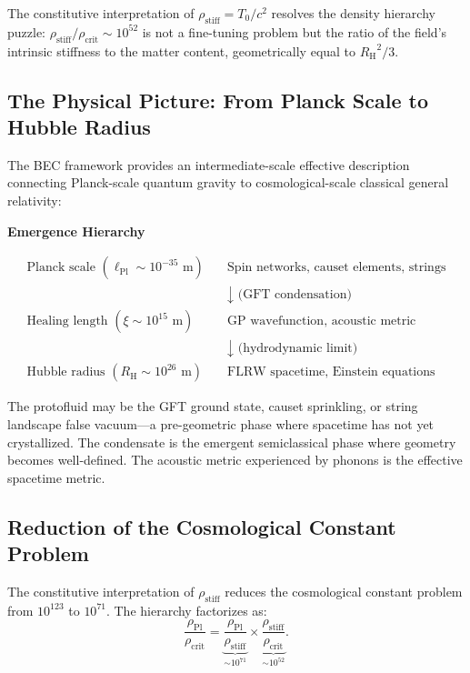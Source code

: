 \documentclass[11pt,a4paper]{article}
\newcommand{\lPl}{\ensuremath{\ell_{\mathrm{Pl}}}}
\newcommand{\rhocrit}{\ensuremath{\rho_{\mathrm{crit}}}}
\newcommand{\rhostiff}{\ensuremath{\rho_{\mathrm{stiff}}}}
\newcommand{\rhoPl}{\ensuremath{\rho_{\mathrm{Pl}}}}
\newcommand{\Tzero}{\ensuremath{T_0}}
\newcommand{\RH}{\ensuremath{R_{\mathrm{H}}}}
\theoremstyle{definition}
\theoremstyle{remark}
\begin{document}
The constitutive interpretation of $\rhostiff = \Tzero/c^2$ resolves the density hierarchy puzzle: $\rhostiff/\rhocrit \sim 10^{52}$ is not a fine-tuning problem but the ratio of the field's intrinsic stiffness to the matter content, geometrically equal to $\RH^2/3$.

\subsection{The Physical Picture: From Planck Scale to Hubble Radius}
\label{sec:physical_picture}

The BEC framework provides an intermediate-scale effective description connecting Planck-scale quantum gravity to cosmological-scale classical general relativity:

\begin{center}
\textbf{Emergence Hierarchy}
\end{center}

\begin{align*}
\text{Planck scale } (\lPl \sim 10^{-35} \text{ m}) &\quad \text{Spin networks, causet elements, strings} \\
&\quad \downarrow \text{ (GFT condensation)} \\
\text{Healing length } (\xi \sim 10^{15} \text{ m}) &\quad \text{GP wavefunction, acoustic metric} \\
&\quad \downarrow \text{ (hydrodynamic limit)} \\
\text{Hubble radius } (\RH \sim 10^{26} \text{ m}) &\quad \text{FLRW spacetime, Einstein equations}
\end{align*}

The protofluid may be the GFT ground state, causet sprinkling, or string landscape false vacuum---a pre-geometric phase where spacetime has not yet crystallized. The condensate is the emergent semiclassical phase where geometry becomes well-defined. The acoustic metric experienced by phonons is the effective spacetime metric.

\subsection{Reduction of the Cosmological Constant Problem}
\label{sec:cc_reduction}

The constitutive interpretation of $\rhostiff$ reduces the cosmological constant problem from $10^{123}$ to $10^{71}$. The hierarchy factorizes as:
\begin{equation}
\frac{\rhoPl}{\rhocrit} = \underbrace{\frac{\rhoPl}{\rhostiff}}_{\sim 10^{71}} \times \underbrace{\frac{\rhostiff}{\rhocrit}}_{\sim 10^{52}}.
\end{equation}
\end{document}
